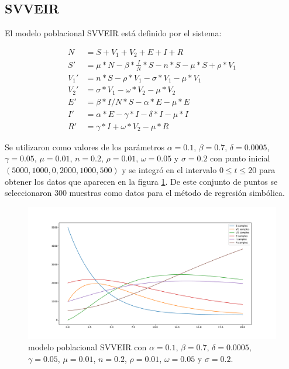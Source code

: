 \subsection{SVVEIR}

El modelo poblacional SVVEIR está definido por el sistema:

\begin{align*}
    N    & = S + V_1 + V_2 + E + I + R                                        \\
    S'   & = \mu * N - \beta * \frac{I}{N} * S - n * S - \mu * S + \rho * V_1 \\
    V_1' & = n * S - \rho * V_1 - \sigma * V_1 - \mu * V_1                    \\
    V_2' & = \sigma * V_1 - \omega * V_2 - \mu * V_2                          \\
    E'   & = \beta * I / N * S - \alpha * E - \mu * E                         \\
    I'   & = \alpha * E - \gamma * I - \delta * I - \mu * I                   \\
    R'   & = \gamma * I + \omega * V_2 - \mu * R
\end{align*}

Se utilizaron como valores de los parámetros $\alpha = 0.1$, $\beta = 0.7$, $\delta = 0.0005$, $\gamma = 0.05$, $\mu = 0.01$, $n = 0.2$, $\rho = 0.01$, $\omega = 0.05$ y $\sigma = 0.2$ con punto inicial $(5000, 1000, 0, 2000, 1000, 500)$ y se integró en el intervalo $0 \leq t \leq 20$ para obtener los datos que aparecen en la figura \ref{fig:SVVEIR}. De este conjunto de puntos se seleccionaron 300 muestras como datos para el método de regresión simbólica.

\begin{figure}[h]
    \centering
    \includegraphics[width=\textwidth]{"figures/SVVEIR.pdf"}
    \caption{modelo poblacional SVVEIR con $\alpha = 0.1$, $\beta = 0.7$, $\delta = 0.0005$, $\gamma = 0.05$, $\mu = 0.01$, $n = 0.2$, $\rho = 0.01$, $\omega = 0.05$ y $\sigma = 0.2$.}
    \label{fig:SVVEIR}
\end{figure}

